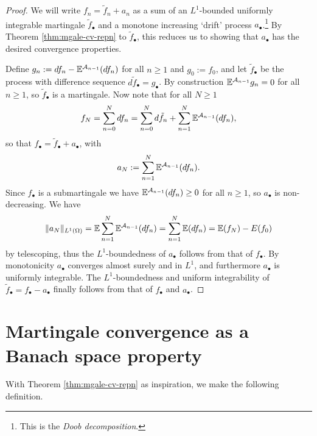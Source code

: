 \begin{proof}
  We will write $f_{n} = \tilde{f}_{n} + a_{n}$ as a sum of an $L^1$-bounded uniformly integrable martingale $\tilde{f}_{\bullet}$ and a monotone increasing `drift' process $a_{\bullet}$.\footnote{This is the \emph{Doob decomposition}.}
  By Theorem \ref{thm:mgale-cv-repn} to $\tilde{f}_{\bullet}$, this reduces us to showing that $a_{\bullet}$ has the desired convergence properties.

  Define $g_{n} := df_{n} - \mathbb{E}^{\mathcal{A}_{n-1}}(df_{n})$ for all $n \geq 1$ and $g_{0} := f_{0}$, and let $\tilde{f}_{\bullet}$ be the process with difference sequence $d\tilde{f}_{\bullet} = g_{\bullet}$.
  By construction $\mathbb{E}^{\mathcal{A}_{n-1}} g_{n} = 0$ for all $n \geq 1$, so $\tilde{f}_{\bullet}$ is a martingale.
  Now note that for all $N \geq 1$
  \begin{equation*}
    f_{N} = \sum_{n=0}^{N} df_{n} = \sum_{n=0}^{N} d\tilde{f}_{n} + \sum_{n=1}^{N} \mathbb{E}^{\mathcal{A}_{n-1}}(df_{n}),
  \end{equation*}
  so that $f_{\bullet} = \tilde{f}_{\bullet} + a_{\bullet}$, with
  \begin{equation*}
    a_{N} := \sum_{n=1}^{N} \mathbb{E}^{\mathcal{A}_{n-1}}(df_{n}). 
  \end{equation*}
  Since $f_{\bullet}$ is a submartingale we have $\mathbb{E}^{\mathcal{A}_{n-1}}(df_{n}) \geq 0$ for all $n \geq 1$, so $a_{\bullet}$ is non-decreasing.
  We have
  \begin{equation*}
    \|a_{N}\|_{L^1(\Omega)} = \mathbb{E} \sum_{n=1}^{N} \mathbb{E}^{\mathcal{A}_{n-1}}(df_{n}) = \sum_{n=1}^{N} \mathbb{E}(df_{n}) = \mathbb{E}(f_{N}) - E(f_{0})
  \end{equation*}
  by telescoping, thus the $L^1$-boundedness of $a_{\bullet}$ follows from that of $f_{\bullet}$.
  By monotonicity $a_{\bullet}$ converges almost surely and in $L^1$, and furthermore $a_{\bullet}$ is uniformly integrable.
  The $L^1$-boundedness and uniform integrability of $\tilde{f}_{\bullet} = f_{\bullet} - a_{\bullet}$ finally follows from that of $f_{\bullet}$ and $a_{\bullet}$.
  
\end{proof}

\section{Martingale convergence as a Banach space property}

With Theorem \ref{thm:mgale-cv-repn} as inspiration, we make the following definition.

